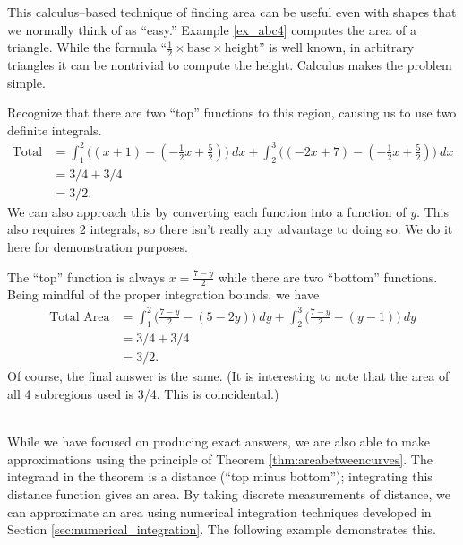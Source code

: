 This calculus--based technique of finding area can be useful even with shapes that we normally think of as ``easy.'' Example \ref{ex_abc4} computes the area of a triangle. While the formula ``$\frac12\times\text{base}\times\text{height}$'' is well known, in arbitrary triangles it can be nontrivial to compute the height. Calculus makes the problem simple.\\

{Recognize that there are two ``top'' functions to this region, causing us to use two definite integrals.
\begin{align*}
\text{Total Area} &= \int_1^2\big((x+1)-(-\frac12x+\frac52)\big)\ dx + \int_2^3\big((-2x+7)-(-\frac12x+\frac52)\big)\ dx \\
						&= 3/4+3/4\\
						&=3/2.
\end{align*}
We can also approach this by converting each function into a function of $y$. This also requires 2 integrals, so there isn't really any advantage to doing so. We do it here for demonstration purposes.

The ``top'' function is always $x=\frac{7-y}2$ while there are two ``bottom'' functions. Being mindful of the proper integration bounds, we have
\begin{align*}
\text{Total Area} &= \int_1^2\big(\frac{7-y}2 - (5-2y)\big)\ dy + \int_2^3\big(\frac{7-y}2-(y-1)\big)\ dy \\
			&= 3/4 + 3/4\\
			&= 3/2.
\end{align*}
Of course, the final answer is the same. (It is interesting to note that the area of all 4 subregions used is 3/4. This is coincidental.)
}\\

While we have focused on producing exact answers, we are also able to make approximations using the principle of Theorem \ref{thm:areabetweencurves}. The integrand in the theorem is a distance (``top minus bottom''); integrating this distance function gives an area. By taking discrete measurements of distance, we can approximate an area using numerical integration techniques developed in Section \ref{sec:numerical_integration}. The following example demonstrates this.\\

